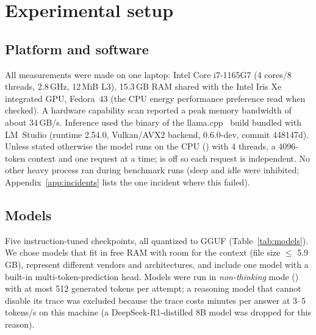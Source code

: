 \section{Experimental setup}
\label{sec:setup}
\subsection{Platform and software}
All measurements were made on one laptop: Intel Core i7-1165G7 (4 cores/8 threads, 2.8\,GHz, 12\,MiB L3), 15.3\,GB RAM shared with the Intel Iris Xe integrated GPU, Fedora~43 (the CPU energy performance preference read  when checked). A hardware capability scan reported a peak memory bandwidth of about 34\,GB/s. Inference used the  binary of the llama.cpp~\citep{llamacpp}
build bundled with LM~Studio (runtime 2.54.0, Vulkan/AVX2 backend,  0.6.0-dev, commit 448147d). Unless stated otherwise the model runs on the CPU
() with 4 threads, a 4096-token context and one request at a time;  is off so each request is independent. No other heavy process ran during benchmark runs
(sleep and idle were inhibited; Appendix~\ref{app:incidents} lists the one incident where this failed).

\subsection{Models}
Five instruction-tuned checkpoints, all quantized to  GGUF (Table~\ref{tab:models}). We chose models that fit in free RAM with room for the context
(file size $\le$ 5.9\,GB), represent different vendors and architectures, and include one model with a built-in multi-token-prediction head.
Models were run in \emph{non-thinking} mode () with at most 512 generated tokens per attempt; a reasoning model that cannot disable its trace was excluded because
the trace costs minutes per answer at 3--5 tokens/s on this machine (a DeepSeek-R1-distilled 8B model was dropped for this reason).
\begin{table}[t]\centering\small
\caption{Models. Sizes are decimal GB of the GGUF file. ``Vendor sampling'' is the vendor's recommendation (Section~\ref{sec:sampling}).}\label{tab:models}

\end{table}

